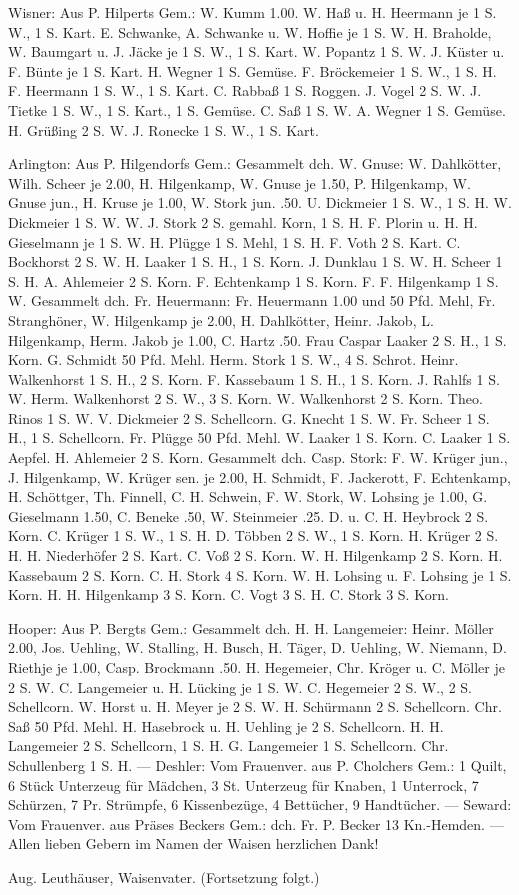 Wisner: Aus P. Hilperts Gem.: W. Kumm 1.00. W. Haß u. H. Heermann je 1 S. W., 1 S. Kart. E. Schwanke, A. Schwanke u. W. Hoffie je 1 S. W. H. Braholde, W. Baumgart u. J. Jäcke je 1 S. W., 1 S. Kart. W. Popantz 1 S. W. J. Küster u. F. Bünte je 1 S. Kart. H. Wegner 1 S. Gemüse. F. Bröckemeier 1 S. W., 1 S. H. F. Heermann 1 S. W., 1 S. Kart. C. Rabbaß 1 S. Roggen. J. Vogel 2 S. W. J. Tietke 1 S. W., 1 S. Kart., 1 S. Gemüse. C. Saß 1 S. W. A. Wegner 1 S. Gemüse. H. Grüßing 2 S. W. J. Ronecke 1 S. W., 1 S. Kart.

Arlington: Aus P. Hilgendorfs Gem.: Gesammelt dch. W. Gnuse: W. Dahlkötter, Wilh. Scheer je 2.00, H. Hilgenkamp, W. Gnuse je 1.50, P. Hilgenkamp, W. Gnuse jun., H. Kruse je 1.00, W. Stork jun. .50. U. Dickmeier 1 S. W., 1 S. H. W. Dickmeier 1 S. W. W. J. Stork 2 S. gemahl. Korn, 1 S. H. F. Plorin u. H. H. Gieselmann je 1 S. W. H. Plügge 1 S. Mehl, 1 S. H. F. Voth 2 S. Kart. C. Bockhorst 2 S. W. H. Laaker 1 S. H., 1 S. Korn. J. Dunklau 1 S. W. H. Scheer 1 S. H. A. Ahlemeier 2 S. Korn. F. Echtenkamp 1 S. Korn. F. F. Hilgenkamp 1 S. W. Gesammelt dch. Fr. Heuermann: Fr. Heuermann 1.00 und 50 Pfd. Mehl, Fr. Stranghöner, W. Hilgenkamp je 2.00, H. Dahlkötter, Heinr. Jakob, L. Hilgenkamp, Herm. Jakob je 1.00, C. Hartz .50. Frau Caspar Laaker 2 S. H., 1 S. Korn. G. Schmidt 50 Pfd. Mehl. Herm. Stork 1 S. W., 4 S. Schrot. Heinr. Walkenhorst 1 S. H., 2 S. Korn. F. Kassebaum 1 S. H., 1 S. Korn. J. Rahlfs 1 S. W. Herm. Walkenhorst 2 S. W., 3 S. Korn. W. Walkenhorst 2 S. Korn. Theo. Rinos 1 S. W. V. Dickmeier 2 S. Schellcorn. G. Knecht 1 S. W. Fr. Scheer 1 S. H., 1 S. Schellcorn. Fr. Plügge 50 Pfd. Mehl. W. Laaker 1 S. Korn. C. Laaker 1 S. Aepfel. H. Ahlemeier 2 S. Korn. Gesammelt dch. Casp. Stork: F. W. Krüger jun., J. Hilgenkamp, W. Krüger sen. je 2.00, H. Schmidt, F. Jackerott, F. Echtenkamp, H. Schöttger, Th. Finnell, C. H. Schwein, F. W. Stork, W. Lohsing je 1.00, G. Gieselmann 1.50, C. Beneke .50, W. Steinmeier .25. D. u. C. H. Heybrock 2 S. Korn. C. Krüger 1 S. W., 1 S. H. D. Többen 2 S. W., 1 S. Korn. H. Krüger 2 S. H. H. Niederhöfer 2 S. Kart. C. Voß 2 S. Korn. W. H. Hilgenkamp 2 S. Korn. H. Kassebaum 2 S. Korn. C. H. Stork 4 S. Korn. W. H. Lohsing u. F. Lohsing je 1 S. Korn. H. H. Hilgenkamp 3 S. Korn. C. Vogt 3 S. H. C. Stork 3 S. Korn.

Hooper: Aus P. Bergts Gem.: Gesammelt dch. H. H. Langemeier: Heinr. Möller 2.00, Jos. Uehling, W. Stalling, H. Busch, H. Täger, D. Uehling, W. Niemann, D. Riethje je 1.00, Casp. Brockmann .50. H. Hegemeier, Chr. Kröger u. C. Möller je 2 S. W. C. Langemeier u. H. Lücking je 1 S. W. C. Hegemeier 2 S. W., 2 S. Schellcorn. W. Horst u. H. Meyer je 2 S. W. H. Schürmann 2 S. Schellcorn. Chr. Saß 50 Pfd. Mehl. H. Hasebrock u. H. Uehling je 2 S. Schellcorn. H. H. Langemeier 2 S. Schellcorn, 1 S. H. G. Langemeier 1 S. Schellcorn. Chr. Schullenberg 1 S. H. — Deshler: Vom Frauenver. aus P. Cholchers Gem.: 1 Quilt, 6 Stück Unterzeug für Mädchen, 3 St. Unterzeug für Knaben, 1 Unterrock, 7 Schürzen, 7 Pr. Strümpfe, 6 Kissenbezüge, 4 Bettücher, 9 Handtücher. — Seward: Vom Frauenver. aus Präses Beckers Gem.: dch. Fr. P. Becker 13 Kn.-Hemden. — Allen lieben Gebern im Namen der Waisen herzlichen Dank!

Aug. Leuthäuser, Waisenvater. (Fortsetzung folgt.)
